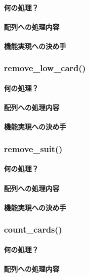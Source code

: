 \documentclass[11pt,a4paper, uplatex]{jsarticle}
\begin{document}
\paragraph{何の処理？}
\paragraph{配列への処理内容}
\paragraph{機能実現への決め手}
%
\subsubsection{remove\_low\_card()}
\paragraph{何の処理？}
\paragraph{配列への処理内容}
\paragraph{機能実現への決め手}
%
\subsubsection{remove\_suit()}
\paragraph{何の処理？}
\paragraph{配列への処理内容}
\paragraph{機能実現への決め手}
%
\subsubsection{count\_cards()}
\paragraph{何の処理？}
\paragraph{配列への処理内容}
\end{document}
